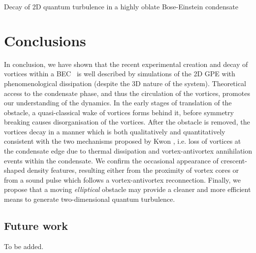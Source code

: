 \begin{chapter}{\label{cha:shin}Decay of 2D quantum turbulence in a highly oblate Bose-Einstein condensate}
\section{Conclusions}
In conclusion, we have shown that the recent experimental creation and decay of vortices within a BEC~\citep{kwon_moon_14} is well described by simulations of the 2D GPE with phenomenological dissipation (despite the 3D nature of the system).  Theoretical access to the condensate phase, and thus the circulation of the vortices, promotes our understanding of the dynamics.  In the early stages of 
translation of the obstacle, a quasi-classical wake of vortices 
forms behind it, before symmetry breaking causes disorganisation 
of the vortices.  After the obstacle is removed, 
the vortices decay in a manner which is both qualitatively and 
quantitatively consistent with the two mechanisms proposed by 
Kwon \etalcc, i.e. loss of vortices at the condensate edge due to thermal dissipation and vortex-antivortex 
annihilation events within the condensate. 
We confirm the occasional appearance of 
crescent-shaped density features, resulting either from the proximity 
of vortex cores or from a sound pulse which follows a 
vortex-antivortex reconnection.  Finally, we propose that a moving {\it elliptical} obstacle may provide a cleaner and more efficient means to generate two-dimensional quantum turbulence.
\subsection{Future work}
To be added.
\end{chapter}
